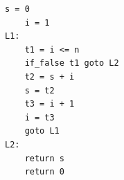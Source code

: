 \begin{lstlisting}[]
    s = 0
    i = 1
L1:
    t1 = i <= n
    if_false t1 goto L2
    t2 = s + i
    s = t2
    t3 = i + 1
    i = t3
    goto L1
L2:
    return s
    return 0
\end{lstlisting}
